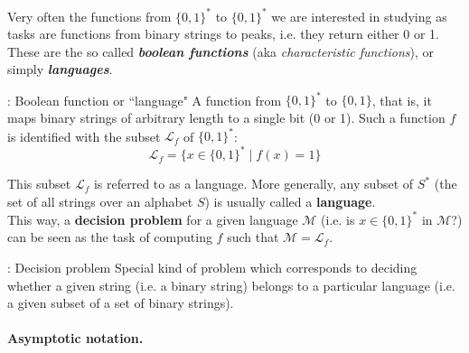 \documentclass{article}
\begin{document}
			Very often the functions from $\{0,1\}^*$ to $\{0,1\}^*$ we are interested in studying as tasks are functions from binary strings to peaks, i.e. they return either 0 or 1. These are the so called \textbf{\textit{boolean functions}} (aka \textit{characteristic functions}), or simply \textbf{\textit{languages}}.
			\begin{definition}{: Boolean function or ``language"}
				A function from $\{0,1\}^*$ to $\{0,1\}$, that is, it maps binary strings of arbitrary length to a single bit (0 or 1). Such a function $f$ is identified with the subset $\mathcal{L}_f$ of $\{0,1\}^*$:
				$$\mathcal{L}_f = \{x \in \{0,1\}^* \; \vert \; f(x) = 1\}$$
			\end{definition}
			This subset $\mathcal{L}_f$ is referred to as a language. More generally, any subset of $S^*$ (the set of all strings over an alphabet $S$) is usually called a \textbf{language}.\\
			This way, a \textbf{decision problem} for a given language $\mathcal{M}$ (i.e. is $x \in \{0,1\}^*$ in $\mathcal{M}$?) can be seen as the task of computing $f$ such that $\mathcal{M}=\mathcal{L}_f$.
			\begin{definition}{: Decision problem}
				Special kind of problem which corresponds to deciding whether a given string (i.e. a binary string) belongs to a particular language (i.e. a given subset of a set of binary strings).
			\end{definition}
			\paragraph{Asymptotic notation.}
			\mbox{}
			\vspace{0.1cm}
\end{document}
